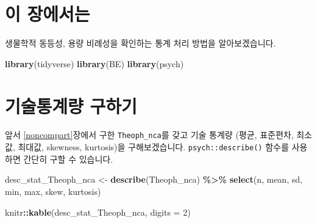 \documentclass[
  12pt,
]{krantz}
\newenvironment{Shaded}{\begin{snugshade}}{\end{snugshade}}
\newcommand{\DataTypeTok}[1]{\textcolor[rgb]{0.13,0.29,0.53}{#1}}
\newcommand{\DecValTok}[1]{\textcolor[rgb]{0.00,0.00,0.81}{#1}}
\newcommand{\KeywordTok}[1]{\textcolor[rgb]{0.13,0.29,0.53}{\textbf{#1}}}
\newcommand{\NormalTok}[1]{#1}
\newcommand{\OperatorTok}[1]{\textcolor[rgb]{0.81,0.36,0.00}{\textbf{#1}}}
\newcommand{\StringTok}[1]{\textcolor[rgb]{0.31,0.60,0.02}{#1}}
\begin{document}
\hypertarget{stat-intro}{%
\section{이 장에서는}\label{stat-intro}}

생물학적 동등성, 용량 비례성을 확인하는 통계 처리 방법을 알아보겠습니다.

\begin{Shaded}
\begin{Highlighting}[]
\KeywordTok{library}\NormalTok{(tidyverse)}
\KeywordTok{library}\NormalTok{(BE)}
\KeywordTok{library}\NormalTok{(psych)}
\end{Highlighting}
\end{Shaded}

\hypertarget{stat-desc}{%
\section{기술통계량 구하기}\label{stat-desc}}

앞서 \ref{noncompart}장에서 구한 \texttt{Theoph\_nca}를 갖고 기술 통계량 (평균, 표준편차, 최소값, 최대값, skewness, kurtosis)을 구해보겠습니다. \texttt{psych::describe()} 함수를 사용하면 간단히 구할 수 있습니다.

\begin{Shaded}
\begin{Highlighting}[]
\NormalTok{desc\_stat\_Theoph\_nca \textless{}{-}}\StringTok{ }\KeywordTok{describe}\NormalTok{(Theoph\_nca) }\OperatorTok{\%\textgreater{}\%}\StringTok{ }
\StringTok{  }\KeywordTok{select}\NormalTok{(n, mean, sd, min, max, skew, kurtosis)}

\NormalTok{knitr}\OperatorTok{::}\KeywordTok{kable}\NormalTok{(desc\_stat\_Theoph\_nca, }\DataTypeTok{digits =} \DecValTok{2}\NormalTok{)}
\end{Highlighting}
\end{Shaded}
\end{document}
